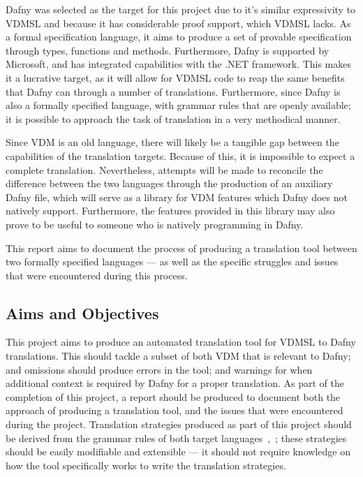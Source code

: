 \documentclass{entcs}
\newcommand{\lfcomment}[1]{\ifthenelse { \boolean{showComments} } {\textcolor{red}{LF:~#1}} { } } %
\begin{document}


Dafny was selected as the target for this project due to it's similar expressivity to VDMSL and because it has considerable proof support, which VDMSL lacks. As a formal specification language, it aims to produce a set of provable specification through types, functions and methods. Furthermore, Dafny is supported by Microsoft, and has integrated capabilities with the .NET framework. This makes it a lucrative target, as it will allow for VDMSL code to reap the same benefits that Dafny can through a number of translations. Furthermore, since Dafny is also a formally specified language, with grammar rules that are openly available; it is possible to approach the task of translation in a very methodical manner.

Since VDM is an old language, there will likely be a tangible gap between the capabilities of the translation targets. Because of this, it is impossible to expect a complete translation. Nevertheless, attempts will be made to reconcile the difference between the two languages through the production of an auxiliary Dafny file, which will serve as a library for VDM features which Dafny does not natively support. Furthermore, the features provided in this library may also prove to be useful to someone who is natively programming in Dafny.

This report aims to document the process of producing a translation tool between two formally specified languages --- as well as the specific struggles and issues that were encountered during this process.

\subsection{Aims and Objectives}

This project aims to produce an automated translation tool for VDMSL to Dafny translations. This should tackle a subset of both VDM that is relevant to Dafny; and omissions should produce errors in the tool; and warnings for when additional context is required by Dafny for a proper translation. As part of the completion of this project, a report should be produced to document both the approach of producing a translation tool, and the issues that were encountered during the project. Translation strategies produced as part of this project should be derived from the grammar rules of both target languages~\cite{DfyGrammar},~\cite{VDMLangMan}; these strategies should be easily modifiable and extensible --- it should not require knowledge on how the tool specifically works to write the translation strategies.
\end{document}
